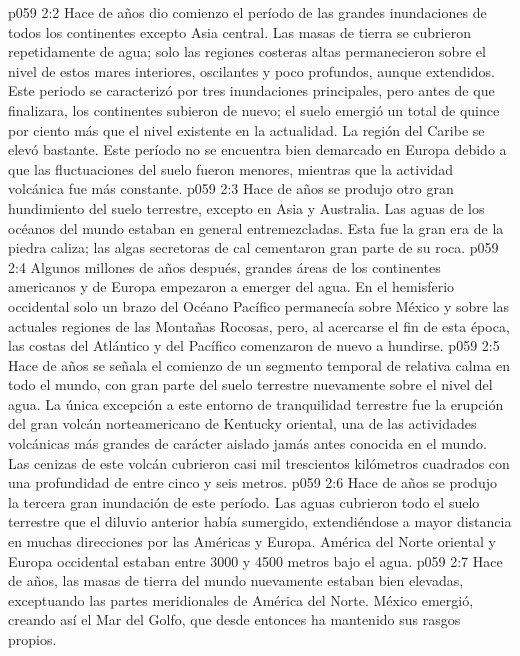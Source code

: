 \vs p059 2:2 \pc Hace  de años dio comienzo el período de las grandes inundaciones de todos los continentes excepto Asia central. Las masas de tierra se cubrieron repetidamente de agua; solo las regiones costeras altas permanecieron sobre el nivel de estos mares interiores, oscilantes y poco profundos, aunque extendidos. Este periodo se caracterizó por tres inundaciones principales, pero antes de que finalizara, los continentes subieron de nuevo; el suelo emergió un total de quince por ciento más que el nivel existente en la actualidad. La región del Caribe se elevó bastante. Este período no se encuentra bien demarcado en Europa debido a que las fluctuaciones del suelo fueron menores, mientras que la actividad volcánica fue más constante.
\vs p059 2:3 \pc Hace  de años se produjo otro gran hundimiento del suelo terrestre, excepto en Asia y Australia. Las aguas de los océanos del mundo estaban en general entremezcladas. Esta fue la gran era de la piedra caliza; las algas secretoras de cal cementaron gran parte de su roca.
\vs p059 2:4 Algunos millones de años después, grandes áreas de los continentes americanos y de Europa empezaron a emerger del agua. En el hemisferio occidental solo un brazo del Océano Pacífico permanecía sobre México y sobre las actuales regiones de las Montañas Rocosas, pero, al acercarse el fin de esta época, las costas del Atlántico y del Pacífico comenzaron de nuevo a hundirse.
\vs p059 2:5 \pc Hace  de años se señala el comienzo de un segmento temporal de relativa calma en todo el mundo, con gran parte del suelo terrestre nuevamente sobre el nivel del agua. La única excepción a este entorno de tranquilidad terrestre fue la erupción del gran volcán norteamericano de Kentucky oriental, una de las actividades volcánicas más grandes de carácter aislado jamás antes conocida en el mundo. Las cenizas de este volcán cubrieron casi mil trescientos kilómetros cuadrados con una profundidad de entre cinco y seis metros.
\vs p059 2:6 \pc Hace  de años se produjo la tercera gran inundación de este período. Las aguas cubrieron todo el suelo terrestre que el diluvio anterior había sumergido, extendiéndose a mayor distancia en muchas direcciones por las Américas y Europa. América del Norte oriental y Europa occidental estaban entre 3000 y 4500 metros bajo el agua.
\vs p059 2:7 \pc Hace  de años, las masas de tierra del mundo nuevamente estaban bien elevadas, exceptuando las partes meridionales de América del Norte. México emergió, creando así el Mar del Golfo, que desde entonces ha mantenido sus rasgos propios.

